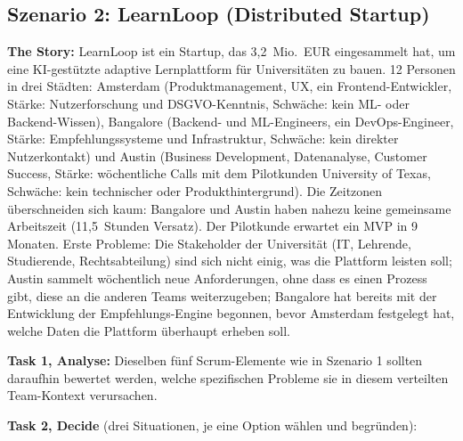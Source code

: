 \subsection*{Szenario 2: LearnLoop (Distributed Startup)}

\textbf{The Story:} LearnLoop ist ein Startup, das 3,2~Mio.~EUR eingesammelt hat, um eine
KI-gestützte adaptive Lernplattform für Universitäten zu bauen. 12 Personen in drei Städten:
Amsterdam (Produktmanagement, UX, ein Frontend-Entwickler, Stärke: Nutzerforschung und
DSGVO-Kenntnis, Schwäche: kein ML- oder Backend-Wissen), Bangalore (Backend- und ML-Engineers, ein
DevOps-Engineer, Stärke: Empfehlungssysteme und Infrastruktur, Schwäche: kein direkter
Nutzerkontakt) und Austin (Business Development, Datenanalyse, Customer Success, Stärke:
wöchentliche Calls mit dem Pilotkunden University of Texas, Schwäche: kein technischer oder
Produkthintergrund). Die Zeitzonen überschneiden sich kaum: Bangalore und Austin haben nahezu keine
gemeinsame Arbeitszeit (11,5~Stunden Versatz). Der Pilotkunde erwartet ein MVP in 9 Monaten.
Erste Probleme: Die Stakeholder der Universität (IT, Lehrende, Studierende, Rechtsabteilung) sind
sich nicht einig, was die Plattform leisten soll; Austin sammelt wöchentlich neue Anforderungen,
ohne dass es einen Prozess gibt, diese an die anderen Teams weiterzugeben; Bangalore hat bereits
mit der Entwicklung der Empfehlungs-Engine begonnen, bevor Amsterdam festgelegt hat, welche Daten
die Plattform überhaupt erheben soll.

\textbf{Task 1, Analyse:} Dieselben fünf Scrum-Elemente wie in Szenario 1 sollten daraufhin bewertet
werden, welche spezifischen Probleme sie in diesem verteilten Team-Kontext verursachen.

\textbf{Task 2, Decide} (drei Situationen, je eine Option wählen und begründen):

